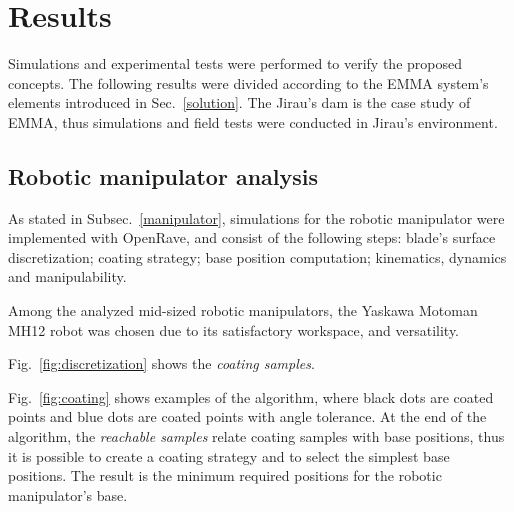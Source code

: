 \section{Results}



Simulations and experimental tests were performed to verify the proposed
concepts. The following results were divided according to the EMMA system's
elements introduced in Sec.~\ref{solution}. The Jirau's dam is the case study of
EMMA, thus simulations and field tests were conducted in Jirau's environment.


\subsection{Robotic manipulator analysis}\label{sec::man_analysis}

As stated in Subsec.~\ref{manipulator}, simulations for the robotic
manipulator were implemented with OpenRave, and consist of the following steps:
blade's surface discretization; coating strategy; base position computation;
kinematics, dynamics and manipulability. 

Among the analyzed mid-sized robotic manipulators, the Yaskawa Motoman MH12
robot was chosen due to its satisfactory workspace, and versatility.

Fig.~\ref{fig:discretization} shows the
\textit{coating samples}. 


Fig.~\ref{fig:coating} shows examples of the algorithm, where black dots are
coated points and blue dots are coated points with angle tolerance. At the end
of the algorithm, the \textit{reachable samples} relate coating samples with base
positions, thus it is possible to create a coating strategy and to select the
simplest base positions. The result is the minimum required positions for the
robotic manipulator's base.

